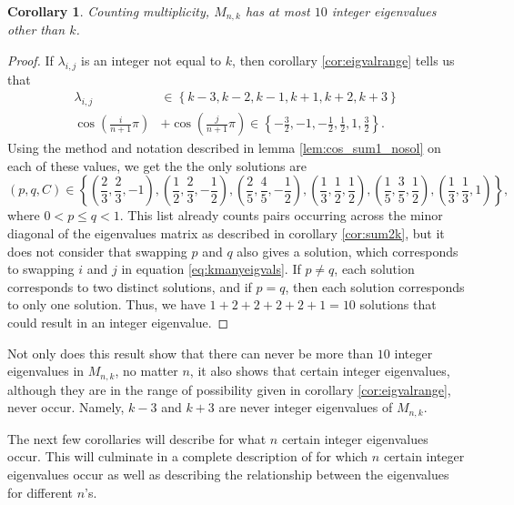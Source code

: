 \documentclass[12pt]{article}
\newtheorem{corollary}{Corollary}
\begin{document}
	\begin{corollary}\label{cor:max10eig}
		Counting multiplicity, $M_{n,k}$ has at most $10$ integer eigenvalues other than $k$.
	\end{corollary}
	\begin{proof}
		If $\lambda_{i,j}$ is an integer not equal to $k$, then corollary
		\ref{cor:eigvalrange} tells us that
		\begin{align*}
		\lambda_{i,j} &\in \left\{k-3, k-2, k-1, k+1, k+2, k+3\right\} \\
		\cos{\left(\frac{i}{n+1}\pi\right)} &+ \cos{\left(\frac{j}{n+1}\pi\right)}
		\in \left\{-\frac{3}{2}, -1, -\frac{1}{2}, \frac{1}{2}, 1, \frac{3}{2}\right\}.
		\end{align*}
		Using the method and notation described in lemma \ref{lem:cos_sum1_nosol} on
		each of these values, we get the the only solutions are
		\begin{equation*}
			(p,q,C) \in \left\{\left(\frac{2}{3},\frac{2}{3},-1\right),
			\left(\frac{1}{2},\frac{2}{3},-\frac{1}{2}\right),
			\left(\frac{2}{5},\frac{4}{5},-\frac{1}{2}\right),
			\left(\frac{1}{3},\frac{1}{2},\frac{1}{2}\right),
			\left(\frac{1}{5},\frac{3}{5},\frac{1}{2}\right),
			\left(\frac{1}{3},\frac{1}{3},1\right)\right\},
		\end{equation*}
		where $0 < p \leq q < 1$.
		This list already counts pairs occurring across the minor diagonal of the
		eigenvalues matrix as described in corollary \ref{cor:sum2k}, but it does not
		consider that swapping $p$ and $q$ also gives a solution, which corresponds to
		swapping $i$ and $j$ in equation \eqref{eq:kmanyeigvals}.
		If $p \neq q$, each solution corresponds to two distinct solutions, and if $p
		= q$, then each solution corresponds to only one solution.
		Thus, we have $1 + 2 + 2 + 2 + 2 + 1 = 10$ solutions that could result in an
		integer eigenvalue.
	\end{proof}
	Not only does this result show that there can never be more than $10$ integer
	eigenvalues in $M_{n,k}$, no matter $n$, it also shows that certain integer
	eigenvalues, although they are in the range of possibility given in corollary
	\ref{cor:eigvalrange}, never occur.
	Namely, $k-3$ and $k+3$ are never integer eigenvalues of $M_{n,k}$.
	
	The next few corollaries will describe for what $n$ certain integer eigenvalues
	occur.
	This will culminate in a complete description of for which $n$ certain integer
	eigenvalues occur as well as describing the relationship between the eigenvalues
	for different $n$'s.
	
\end{document}
